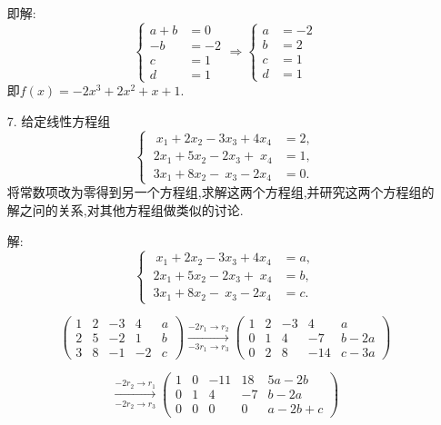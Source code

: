 \documentclass{article}
\begin{document}
\begin{enumerate}
        即解:
        \[
            \begin{cases}
                a+b&=0\\
                -b&=-2\\
                c&=1\\
                d&=1
            \end{cases}
            \Rightarrow
            \begin{cases}
                a&=-2\\
                b&=2\\
                c&=1\\
                d&=1
            \end{cases}
        \]
        即$f(x)=-2x^3+2x^2+x+1$.
        \item [7.]给定线性方程组
        \[
            \begin{cases}
                \ \ x_1+2x_2-3x_3+4x_4&=2,\\
                \ 2x_1+5x_2-2x_3+\;x_4&=1,\\
                \ 3x_1+8x_2-\ x_3-2x_4&=0.
            \end{cases}
        \]
        将常数项改为零得到另一个方程组,求解这两个方程组,并研究这两个方程组的解之问的关系,对其他方程组做类似的讨论.
        
        解:
        \[
            \begin{cases}
                \ \ x_1+2x_2-3x_3+4x_4&=a,\\
                \ 2x_1+5x_2-2x_3+\;x_4&=b,\\
                \ 3x_1+8x_2-\ x_3-2x_4&=c.
            \end{cases}
        \]

        \[
            \begin{pmatrix}
                1& 2& -3& 4& a\\
                2& 5& -2& 1& b\\
                3& 8& -1& -2& c
            \end{pmatrix}
            \xrightarrow[-3r_1 \rightarrow r_3]{-2r_1 \rightarrow r_2}
            \begin{pmatrix}
                1& 2& -3& 4& a\\
                0& 1& 4& -7& b-2a\\
                0& 2& 8& -14& c-3a
            \end{pmatrix}
        \]
        
        \[
            \xrightarrow[-2r_2 \rightarrow r_3]{-2r_2 \rightarrow r_1}
            \begin{pmatrix}
            1& 0& -11& 18& 5a-2b\\
            0& 1& 4& -7& b-2a\\
            0& 0& 0& 0& a-2b+c
            \end{pmatrix}
        \]
        

\end{enumerate}
\end{document}
